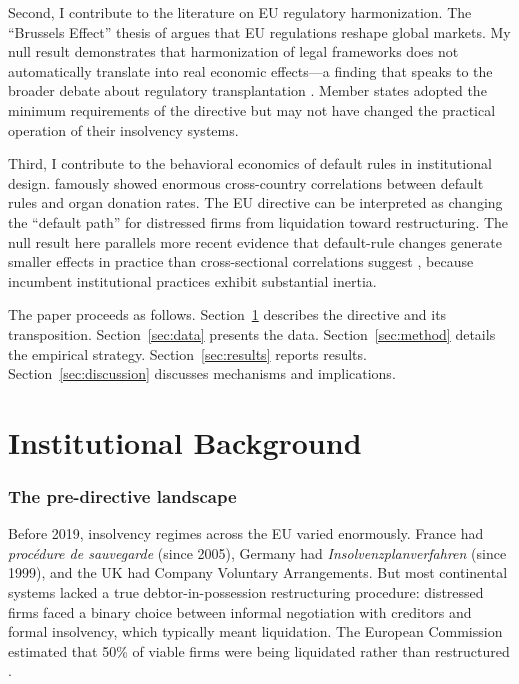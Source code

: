 \documentclass[12pt]{article}
\begin{document}
Second, I contribute to the literature on EU regulatory harmonization. The ``Brussels Effect'' thesis of \citet{Bradford2020} argues that EU regulations reshape global markets. My null result demonstrates that harmonization of legal frameworks does not automatically translate into real economic effects---a finding that speaks to the broader debate about regulatory transplantation \citep{BerkowitzEtAl2003}. Member states adopted the minimum requirements of the directive but may not have changed the practical operation of their insolvency systems.

Third, I contribute to the behavioral economics of default rules in institutional design. \citet{JohnsonGoldstein2003} famously showed enormous cross-country correlations between default rules and organ donation rates. The EU directive can be interpreted as changing the ``default path'' for distressed firms from liquidation toward restructuring. The null result here parallels more recent evidence that default-rule changes generate smaller effects in practice than cross-sectional correlations suggest \citep{Steffel2016}, because incumbent institutional practices exhibit substantial inertia.

The paper proceeds as follows. Section~\ref{sec:background} describes the directive and its transposition. Section~\ref{sec:data} presents the data. Section~\ref{sec:method} details the empirical strategy. Section~\ref{sec:results} reports results. Section~\ref{sec:discussion} discusses mechanisms and implications.


\section{Institutional Background}
\label{sec:background}

\subsubsection*{The pre-directive landscape} Before 2019, insolvency regimes across the EU varied enormously. France had \textit{proc\'{e}dure de sauvegarde} (since 2005), Germany had \textit{Insolvenzplanverfahren} (since 1999), and the UK had Company Voluntary Arrangements. But most continental systems lacked a true debtor-in-possession restructuring procedure: distressed firms faced a binary choice between informal negotiation with creditors and formal insolvency, which typically meant liquidation. The European Commission estimated that 50\% of viable firms were being liquidated rather than restructured \citep{EUCommission2016}.
\end{document}
